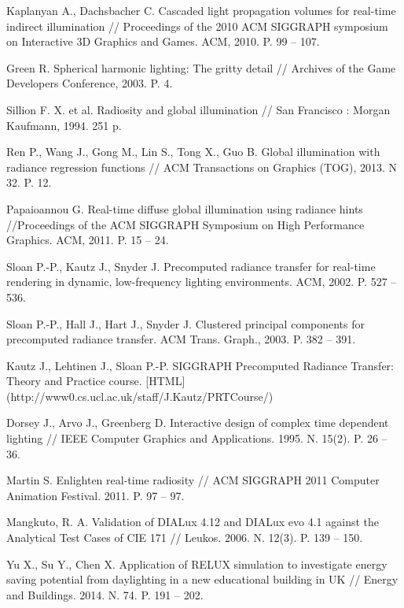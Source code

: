 \documentclass[oneside,final,12pt, a4paper]{extreport}
\begin{document}
\begin{thebibliography}{00}
 Kaplanyan A., Dachsbacher C. Cascaded light propagation volumes for real-time indirect illumination // Proceedings of the 2010 ACM SIGGRAPH symposium on Interactive 3D Graphics and Games. ACM, 2010. P. 99 -- 107.

 Green R. Spherical harmonic lighting: The gritty detail // Archives of the Game Developers Conference, 2003. P. 4.

 Sillion F. X. et al. Radiosity and global illumination // San Francisco : Morgan Kaufmann, 1994. 251 p.

 Ren P., Wang J., Gong M., Lin S., Tong X., Guo B. Global illumination with radiance regression functions // ACM Transactions on Graphics (TOG), 2013. N 32. P. 12.

 Papaioannou G. Real-time diffuse global illumination using radiance hints //Proceedings of the ACM SIGGRAPH Symposium on High Performance Graphics. ACM, 2011. P. 15 -- 24.

 Sloan P.-P., Kautz J., Snyder J. Precomputed radiance transfer for real-time rendering in dynamic, low-frequency lighting environments. ACM, 2002. P. 527 -- 536.

 Sloan P.-P., Hall J., Hart J., Snyder J. Clustered principal components for precomputed radiance transfer. ACM Trans. Graph., 2003. P. 382 -- 391.

 Kautz J., Lehtinen J., Sloan P.-P. SIGGRAPH Precomputed Radiance Transfer: Theory and Practice course. [HTML] (http://www0.cs.ucl.ac.uk/staff/J.Kautz/PRTCourse/)

 Dorsey J., Arvo J., Greenberg D. Interactive design of complex time dependent lighting // IEEE Computer Graphics and Applications. 1995. N. 15(2). P. 26 -- 36.

 Martin S.  Enlighten real-time radiosity // ACM SIGGRAPH 2011 Computer Animation Festival. 2011. P. 97 -- 97.

 Mangkuto, R. A. Validation of DIALux 4.12 and DIALux evo 4.1 against the Analytical Test Cases of CIE 171 // Leukos. 2006. N. 12(3). P. 139 -- 150.

 Yu X., Su Y., Chen X. Application of RELUX simulation to investigate energy saving potential from daylighting in a new educational building in UK // Energy and Buildings. 2014. N. 74. P. 191 -- 202.

\end{thebibliography}
\end{document}
